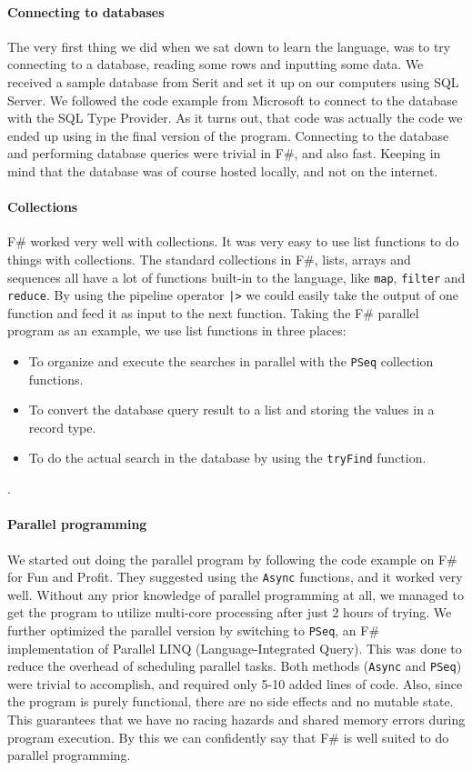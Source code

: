 \documentclass[12pt, a4paper]{article}
\newcommand{\code}[1]{{\small \texttt{#1}}}
\begin{document}
\paragraph{Connecting to databases} The very first thing we did when we sat down to learn the language, was to try connecting to a database, reading some rows and inputting some data. We received a sample database from Serit and set it up on our computers using SQL Server. We followed the code example from Microsoft to connect to the database with the SQL Type Provider. As it turns out, that code was actually the code we ended up using in the final version of the program. Connecting to the database and performing database queries were trivial in F\#, and also fast. Keeping in mind that the database was of course hosted locally, and not on the internet.

\newpage
\paragraph{Collections} F\# worked very well with collections. It was very easy to use list functions to do things with collections. The standard collections in F\#, lists, arrays and sequences all have a lot of functions built-in to the language, like \code{map}, \code{filter} and \code{reduce}. By using the pipeline operator \code{|>} we could easily take the output of one function and feed it as input to the next function. Taking the F\# parallel program as an example, we use list functions in three places: 

\begin{itemize}
	\item To organize and execute the searches in parallel with the \code{PSeq} collection functions.
	\item To convert the database query result to a list and storing the values in a record type.
	\item To do the actual search in the database by using the \code{tryFind} function.
\end{itemize}.

\paragraph{Parallel programming} We started out doing the parallel program by following the code example on F\# for Fun and Profit. They suggested using the \code{Async} functions, and it worked very well. Without any prior knowledge of parallel programming at all, we managed to get the program to utilize multi-core processing after just 2 hours of trying. We further optimized the parallel version by switching to \code{PSeq}, an F\# implementation of Parallel LINQ (Language-Integrated Query). This was done to reduce the overhead of scheduling parallel tasks. Both methods (\code{Async} and \code{PSeq}) were trivial to accomplish, and required only 5-10 added lines of code. Also, since the program is purely functional, there are no side effects and no mutable state. This guarantees that we have no racing hazards and shared memory errors during program execution. By this we can confidently say that F\# is well suited to do parallel programming.
\end{document}
